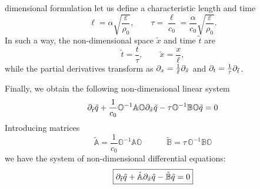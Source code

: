 \documentclass[
10pt, %
a4paper, %
oneside, %
headinclude,footinclude, %
table
]{scrartcl}
\begin{document}
dimensional 
formulation let us define a characteristic length and time 
\begin{equation}\label{CharacteristicSize}
\ell=\alpha  \sqrt{\frac{\varepsilon}{\rho_{0}}}, \quad\quad 
\tau=\frac{\ell}{c_{0}}=\frac{\alpha}{c_{0}}  \sqrt{\frac{\varepsilon}{\rho_{0}}}.
\end{equation}
In such a way, the non-dimensional space $ \tilde{x} $ and time $ \tilde{t} $ are
\begin{equation}\label{Rescaling}
\tilde{t}=\frac{t}{\tau}, \qquad \tilde{x}=\frac{x}{\ell},
\end{equation}
while the partial derivatives transform as $\partial_{x}=\frac{1}{\ell}\partial_{\tilde{x}}$ and 
$\partial_{t}=\frac{1}{\tau}\partial_{\tilde{t}}$. 

Finally, we obtain the following non-dimensional linear 
system 
\begin{equation}
\partial_{\tilde{t}}\tilde{q}+\frac{1}{c_{0}}\mathbb{O}^{-1}\mathbb{A}\mathbb{O}\partial_{\tilde{x}}\tilde{q}-\tau
 \mathbb{O}^{-1}\mathbb{B}\mathbb{O}\tilde{q}=0
\end{equation}
Introducing matrices
\begin{equation}\label{nondim.matrices}
\tilde{\mathbb{A}} = \frac{1}{c_{0}}\mathbb{O}^{-1}\mathbb{A}\mathbb{O}
\quad\quad\quad
\tilde{\mathbb{B}} = \tau\,\mathbb{O}^{-1}\mathbb{B}\mathbb{O}
\end{equation}
we have the system of non-dimensional differential equations:
\begin{equation}\label{SystDiffAdim}
\boxed{\partial_{\tilde{t}}\tilde{q}+\tilde{\mathbb{A}}\partial_{\tilde{x}}\tilde{q}-\tilde{\mathbb{B}}\tilde{q}=0}
\end{equation}
\end{document}
